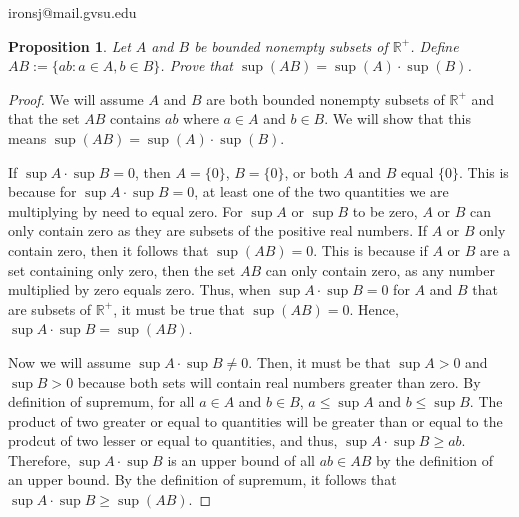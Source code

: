 \documentclass[11 pt]{article}
\newtheorem{proposition}{Proposition}
\newcommand{\newpar}{\vspace{.15in}\noindent}
\begin{document}
\noindent ironsj@mail.gvsu.edu
\newpar
\begin{proposition}
Let $A$ and $B$ be bounded nonempty subsets of $\mathbb{R}^+$. Define $AB :=\{ ab : a \in A, b \in B\}$. Prove that $\sup(AB)=\sup(A)\cdot \sup(B)$.
\end{proposition}
\begin{proof}
We will assume $A$ and $B$ are both bounded nonempty subsets of $\mathbb{R}^+$ and that the set $AB$ contains $ab$ where $a\in A$ and $b\in B$. We will show that this means $\sup(AB)=\sup(A)\cdot \sup(B)$. 

\newpar
If $\sup A\cdot\sup B=0$, then $A=\{0\}$, $B=\{0\}$, or both $A$ and $B$ equal $\{0\}$. This is because for $\sup A\cdot\sup B=0$, at least one of the two quantities we are multiplying by need to equal zero. For $\sup A$ or $\sup B$ to be zero, $A$ or $B$ can only contain zero as they are subsets of the positive real numbers. If $A$ or $B$ only contain zero, then it follows that $\sup(AB)=0$. This is because if $A$ or $B$ are a set containing only zero, then the set $AB$ can only contain zero, as any number multiplied by zero equals zero. Thus, when $\sup A\cdot\sup B=0$ for $A$ and $B$ that are subsets of $\mathbb{R}^+$, it must be true that $\sup(AB)=0$. Hence, $\sup A\cdot\sup B=\sup(AB)$.

\newpar
Now we will assume $\sup A\cdot\sup B\neq0$. Then, it must be that $\sup A>0$ and $\sup B>0$ because both sets will contain real numbers greater than zero. By definition of supremum, for all $a\in A$ and $b\in B$, $a\le\sup A$ and $b\le\sup B$. The product of two greater or equal to quantities will be greater than or equal to the prodcut of two lesser or equal to quantities, and thus, $\sup A\cdot\sup B\ge ab$. Therefore, $\sup A\cdot\sup B$ is an upper bound of all $ab\in AB$ by the definition of an upper bound. By the definition of supremum, it follows that $\sup A\cdot\sup B\ge\sup(AB)$.


\end{proof}
\end{document}

